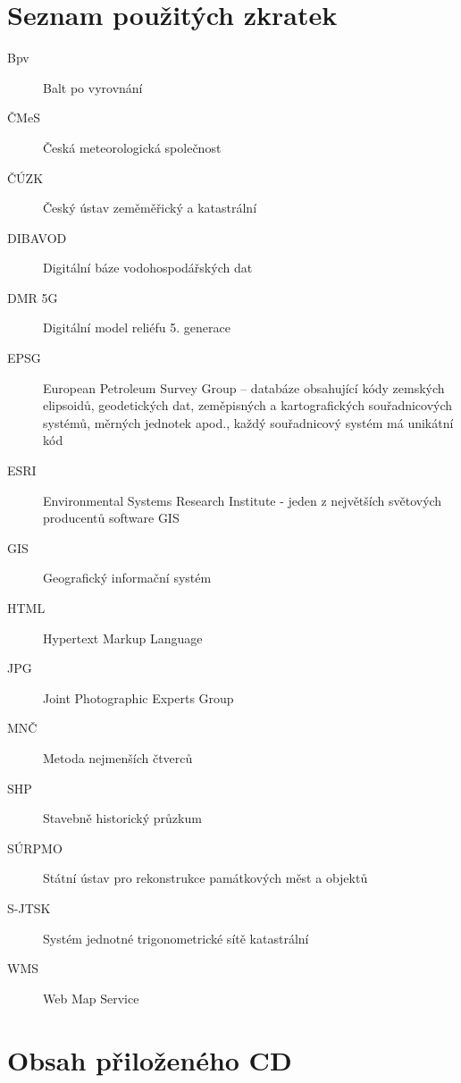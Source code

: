 \documentclass[thesis=M,czech]{FITthesis}[2012/06/26]
\begin{document}
\chapter{Seznam použitých zkratek}
\begin{description}
	\item[Bpv] Balt po vyrovnání
	\item[ČMeS] Česká meteorologická společnost
	\item[ČÚZK] Český ústav zeměměřický a katastrální
	\item[DIBAVOD] Digitální báze vodohospodářských dat
	\item[DMR 5G] Digitální model reliéfu 5. generace
	\item[EPSG] European Petroleum Survey Group – databáze obsahující kódy zemských elipsoidů, geodetických dat, zeměpisných a kartografických souřadnicových systémů, měrných jednotek apod., každý souřadnicový systém má unikátní kód
	\item[ESRI] Environmental Systems Research Institute - jeden z největších světových producentů software GIS
	\item[GIS] Geografický informační systém
	\item[HTML] Hypertext Markup Language
	\item[JPG] Joint Photographic Experts Group
	\item[MNČ] Metoda nejmenších čtverců
	\item[SHP] Stavebně historický průzkum
	\item[SÚRPMO] Státní ústav pro rekonstrukce památkových měst a objektů
	\item[S-JTSK] Systém jednotné trigonometrické sítě katastrální
	\item[WMS] Web Map Service

\end{description}



\chapter{Obsah přiloženého CD}

\begin{figure}
\end{figure}
\end{document}
